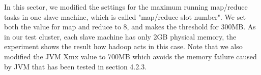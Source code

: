 In this sector, we modified the settings for the maximum running map/reduce tasks in one slave machine, which is called "map/reduce slot number". We set both the value for map and reduce to 8, and makes the threshold for 300MB. As in our test cluster, each slave machine has only 2GB physical memory, the experiment shows the result how hadoop acts in this case. Note that we also modified the JVM Xmx value to 700MB which avoids the memory failure caused by JVM that has been tested in section 4.2.3.


